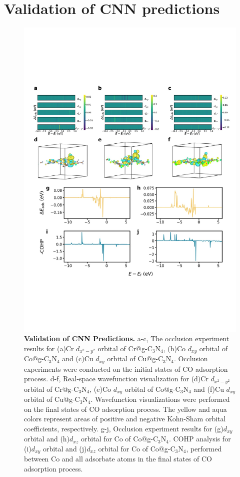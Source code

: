 

\section{Validation of CNN predictions}

\begin{figure}
    \centering
    \includegraphics[width=0.95\linewidth]{main_sections/figures/main_fig4_validation.JPG}
    \caption{\textbf{Validation of CNN Predictions.}
    a-c, The occlusion experiment results for (a)Cr $d_{x^2-y^2}$ orbital of Cr@g-$\mathrm{C_3N_4}$, (b)Co $d_{xy}$ orbital of Co@g-$\mathrm{C_3N_4}$ and (c)Cu $d_{xy}$ orbital of Cu@g-$\mathrm{C_3N_4}$.
    Occlusion experiments were conducted on the initial states of CO adsorption process.
    d-f, Real-space wavefunction visualization for (d)Cr $d_{x^2-y^2}$ orbital of Cr@g-$\mathrm{C_3N_4}$, (e)Co $d_{xy}$ orbital of Co@g-$\mathrm{C_3N_4}$ and (f)Cu $d_{xy}$ orbital of Cu@g-$\mathrm{C_3N_4}$.
    Wavefunction visualizations were performed on the final states of CO adsorption process.
    The yellow and aqua colors represent areas of positive and negative Kohn-Sham orbital coefficients, respectively.
    g-j, Occlusion experiment results for (g)$d_{xy}$ orbital and (h)$d_{xz}$ orbital for Co of Co@g-$\mathrm{C_3N_4}$.
    COHP analysis for (i)$d_{xy}$ orbital and (j)$d_{xz}$ orbital for Co of Co@g-$\mathrm{C_3N_4}$, performed between Co and all adsorbate atoms in the final states of CO adsorption process.}
    \label{main_fig4:validation}
\end{figure}

